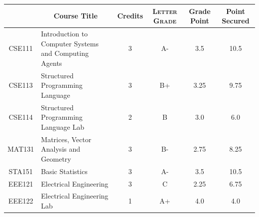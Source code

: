\documentclass[11pt]{article}
\newcommand*{\numtwo}[1]{\pgfmathprintnumber[
                    fixed, precision=2, fixed zerofill=true]{#1}}
\begin{document}
                \begin{center}
                    \renewcommand{\arraystretch}{1.08}
                    
                \begin{tabular}{|c|l|c|>{\scshape}c|c|c|}
                \hline  \rule[-1ex]{0pt}{3.5ex} {\centering{\bf Course Code}} &  \multicolumn{1}{c|}{\textbf{Course Title}}  & {\bf Credits} & {\bf Letter Grade} & {\bf Grade Point} & {\bf Point Secured}  \\ 
                \hline   CSE111 &  Introduction to Computer Systems and Computing Agents		 & 3 & A- & 3.5 & 10.5 \\ %
                \hline   CSE113 &  Structured Programming Language		 & 3 & B+ & 3.25 & 9.75 \\ %
                \hline   CSE114 &  Structured Programming Language Lab		 & 2 & B & 3.0 & 6.0 \\ %
                \hline   MAT131 &  Matrices, Vector Analysis and Geometry		 & 3 & B- & 2.75 & 8.25 \\ %
                \hline   STA151 &  Basic Statistics		 & 3 & A- & 3.5 & 10.5 \\ %
                \hline   EEE121 &  Electrical Engineering		 & 3 & C & 2.25 & 6.75 \\ %
                \hline   EEE122 &  Electrical Engineering Lab		 & 1 & A+ & 4.0 & 4.0 \\ %

\hline                %
                \end{tabular}
                \end{center}
                \renewcommand{\arraystretch}{1.03}
\end{document}
